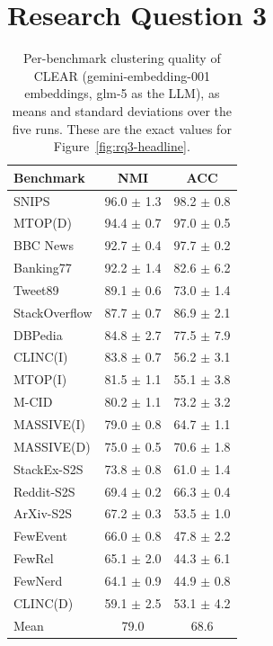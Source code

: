\documentclass[11pt,a4paper,oneside]{report}
\begin{document}
\FloatBarrier

\section{Research Question 3}\label{app:results-rq3}

\begin{table}[htbp]
\centering
\small
\begin{tabular}{lcc}
\toprule
Benchmark & NMI & ACC \\
\midrule
SNIPS & 96.0 $\pm$ 1.3 & 98.2 $\pm$ 0.8 \\
MTOP(D) & 94.4 $\pm$ 0.7 & 97.0 $\pm$ 0.5 \\
BBC News & 92.7 $\pm$ 0.4 & 97.7 $\pm$ 0.2 \\
Banking77 & 92.2 $\pm$ 1.4 & 82.6 $\pm$ 6.2 \\
Tweet89 & 89.1 $\pm$ 0.6 & 73.0 $\pm$ 1.4 \\
StackOverflow & 87.7 $\pm$ 0.7 & 86.9 $\pm$ 2.1 \\
DBPedia & 84.8 $\pm$ 2.7 & 77.5 $\pm$ 7.9 \\
CLINC(I) & 83.8 $\pm$ 0.7 & 56.2 $\pm$ 3.1 \\
MTOP(I) & 81.5 $\pm$ 1.1 & 55.1 $\pm$ 3.8 \\
M-CID & 80.2 $\pm$ 1.1 & 73.2 $\pm$ 3.2 \\
MASSIVE(I) & 79.0 $\pm$ 0.8 & 64.7 $\pm$ 1.1 \\
MASSIVE(D) & 75.0 $\pm$ 0.5 & 70.6 $\pm$ 1.8 \\
StackEx-S2S & 73.8 $\pm$ 0.8 & 61.0 $\pm$ 1.4 \\
Reddit-S2S & 69.4 $\pm$ 0.2 & 66.3 $\pm$ 0.4 \\
ArXiv-S2S & 67.2 $\pm$ 0.3 & 53.5 $\pm$ 1.0 \\
FewEvent & 66.0 $\pm$ 0.8 & 47.8 $\pm$ 2.2 \\
FewRel & 65.1 $\pm$ 2.0 & 44.3 $\pm$ 6.1 \\
FewNerd & 64.1 $\pm$ 0.9 & 44.9 $\pm$ 0.8 \\
CLINC(D) & 59.1 $\pm$ 2.5 & 53.1 $\pm$ 4.2 \\
\midrule
Mean & 79.0 & 68.6 \\
\bottomrule
\end{tabular}
\caption[CLEAR per-benchmark scores]{Per-benchmark clustering quality of CLEAR ({\small\ttfamily gemini-embedding-001} embeddings, {\small\ttfamily glm-5} as the LLM), as means and standard deviations over the five runs. These are the exact values for Figure~\ref{fig:rq3-headline}.}
\label{tab:rq3-headline}
\end{table}
\end{document}
